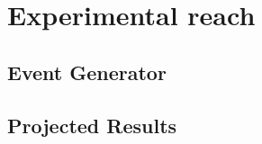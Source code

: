 \chapter{Experimental reach}
\label{chap:reach}

\section{Event Generator}


\section{Projected Results}


